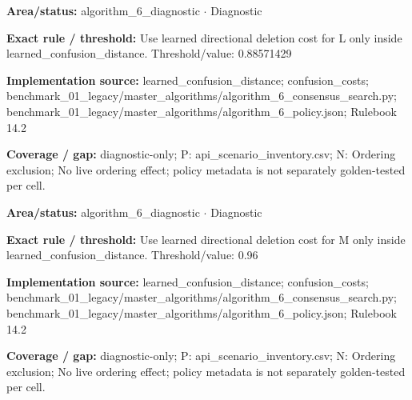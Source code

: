 \begin{tcolorbox}[enhanced,breakable,colback=white,colframe=Muted!45,boxrule=0.45pt,arc=1.5pt,left=6pt,right=6pt,top=5pt,bottom=5pt,title={\texttt{A6-LEARNED-DELETION-L}},title after break={\texttt{A6-LEARNED-DELETION-L}\ (continued)},fonttitle=\headingfont\bfseries\color{Navy},coltitle=Navy]
\textbf{Area/status:} algorithm\_\allowbreak{}6\_\allowbreak{}diagnostic $\boldsymbol{\cdot}$ Diagnostic\par
\smallskip
\textbf{Exact rule / threshold:} Use learned directional deletion cost for L only inside learned\_\allowbreak{}confusion\_\allowbreak{}distance. Threshold/\allowbreak{}value: 0.88571429\par
\smallskip
\textbf{Implementation source:} learned\_\allowbreak{}confusion\_\allowbreak{}distance; confusion\_\allowbreak{}costs; benchmark\_\allowbreak{}01\_\allowbreak{}legacy/\allowbreak{}master\_\allowbreak{}algorithms/\allowbreak{}algorithm\_\allowbreak{}6\_\allowbreak{}consensus\_\allowbreak{}search.py; benchmark\_\allowbreak{}01\_\allowbreak{}legacy/\allowbreak{}master\_\allowbreak{}algorithms/\allowbreak{}algorithm\_\allowbreak{}6\_\allowbreak{}policy.json; Rulebook 14.2\par
\smallskip
\textbf{Coverage / gap:} diagnostic-only; P: api\_\allowbreak{}scenario\_\allowbreak{}inventory.csv; N: Ordering exclusion; No live ordering effect; policy metadata is not separately golden-tested per cell.
\end{tcolorbox}
\begin{tcolorbox}[enhanced,breakable,colback=white,colframe=Muted!45,boxrule=0.45pt,arc=1.5pt,left=6pt,right=6pt,top=5pt,bottom=5pt,title={\texttt{A6-LEARNED-DELETION-M}},title after break={\texttt{A6-LEARNED-DELETION-M}\ (continued)},fonttitle=\headingfont\bfseries\color{Navy},coltitle=Navy]
\textbf{Area/status:} algorithm\_\allowbreak{}6\_\allowbreak{}diagnostic $\boldsymbol{\cdot}$ Diagnostic\par
\smallskip
\textbf{Exact rule / threshold:} Use learned directional deletion cost for M only inside learned\_\allowbreak{}confusion\_\allowbreak{}distance. Threshold/\allowbreak{}value: 0.96\par
\smallskip
\textbf{Implementation source:} learned\_\allowbreak{}confusion\_\allowbreak{}distance; confusion\_\allowbreak{}costs; benchmark\_\allowbreak{}01\_\allowbreak{}legacy/\allowbreak{}master\_\allowbreak{}algorithms/\allowbreak{}algorithm\_\allowbreak{}6\_\allowbreak{}consensus\_\allowbreak{}search.py; benchmark\_\allowbreak{}01\_\allowbreak{}legacy/\allowbreak{}master\_\allowbreak{}algorithms/\allowbreak{}algorithm\_\allowbreak{}6\_\allowbreak{}policy.json; Rulebook 14.2\par
\smallskip
\textbf{Coverage / gap:} diagnostic-only; P: api\_\allowbreak{}scenario\_\allowbreak{}inventory.csv; N: Ordering exclusion; No live ordering effect; policy metadata is not separately golden-tested per cell.
\end{tcolorbox}
